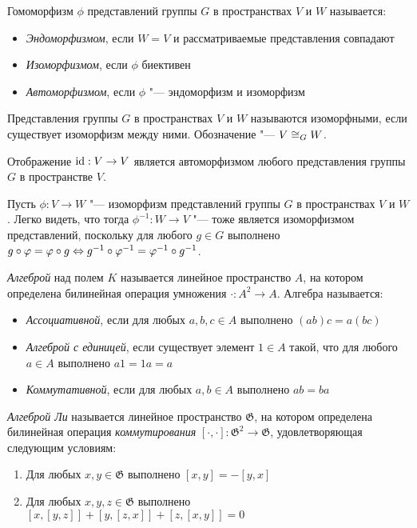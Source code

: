 \begin{definition}
	Гомоморфизм $\phi$ представлений группы $G$ в пространствах $V$ и $W$ называется:
	\begin{itemize}
		\item \textit{Эндоморфизмом}, если $W = V$ и рассматриваемые представления совпадают
		\item \textit{Изоморфизмом}, если $\phi$ биективен
		\item \textit{Автоморфизмом}, если $\phi$ "--- эндоморфизм и изоморфизм
	\end{itemize}
\end{definition}

\begin{definition}
	Представления группы $G$ в пространствах $V$ и $W$ называются изоморфными, если существует изоморфизм между ними. Обозначение "--- $V \cong_G W$.
\end{definition}

\begin{example}
	Отображение $\mathrm{id} : V \to V$ является автоморфизмом любого представления группы $G$ в пространстве $V$.
\end{example}

\begin{note}
	Пусть $\phi : V \to W$ "--- изоморфизм представлений группы $G$ в пространствах $V$ и $W$. Легко видеть, что тогда $\phi^{-1} : W \to V$ "--- тоже является изоморфизмом представлений, поскольку для любого $g \in G$ выполнено $g\circ\varphi = \varphi \circ g \Leftrightarrow g^{-1}\circ\varphi^{-1} = \varphi^{-1}\circ g^{-1}$.
\end{note}

\begin{definition}
	\textit{Алгеброй} над полем $K$ называется линейное пространство $A$, на котором определена билинейная операция умножения $\cdot : A^2 \to A$. Алгебра называется:
	\begin{itemize}
		\item \textit{Ассоциативной}, если для любых $a, b, c \in A$ выполнено $(ab)c = a(bc)$
		\item \textit{Алгеброй с единицей}, если существует элемент $1 \in A$ такой, что для любого $a \in A$ выполнено $a1 = 1a = a$
		\item \textit{Коммутативной}, если для любых $a, b \in A$ выполнено $ab = ba$
	\end{itemize}
\end{definition}

\begin{definition}
	\textit{Алгеброй Ли} называется линейное пространство $\mathfrak G$, на котором определена билинейная операция \textit{коммутирования} $[\cdot,\cdot] : \mathfrak G^2 \to \mathfrak G$, удовлетворяющая следующим условиям:
	\begin{enumerate}
		\item Для любых $x, y \in \mathfrak G$ выполнено $[x, y] = -[y, x]$
		\item Для любых $x, y, z \in \mathfrak G$ выполнено $[x, [y, z]] + [y, [z, x]] + [z, [x, y]] = 0$
	\end{enumerate}
\end{definition}

